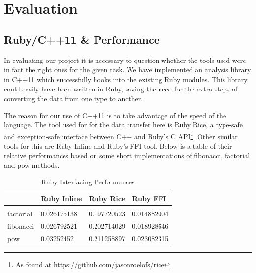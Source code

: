 \documentclass[11pt, abstracton, twoside, titlepage=true]{scrartcl}
\begin{document}


\newpage

\section{Evaluation}
\thispagestyle{empty}
\subsection{Ruby/C++11 \& Performance}
In evaluating our project it is necessary to question whether the tools used were
in fact the right ones for the given task. We have implemented an analysis library
in C++11 which successfully hooks into the existing Ruby modules. This library
could easily have been written in Ruby, saving the need for the extra steps
of converting the data from one type to another. 

The reason for our
use of C++11 is to take advantage of the speed of the language. The tool used for
for the data transfer here is Ruby Rice, a type-safe and exception-safe interface
between C++ and Ruby's C API\footnote{As found at https://github.com/jasonroelofs/rice}.
Other similar tools for this are Ruby Inline and Ruby's FFI tool. Below is a table
of their relative performances based on some short implementations of fibonacci, 
factorial and pow methods.

\begin{table}[h]
	\centering
	\caption{Ruby Interfacing Performances \cite{amber}} \label{ruby}

	\begin{tabular}{llll}
	          \\
	          & Ruby Inline & Ruby Rice   & Ruby FFI  \\ \hline
	          \\
	factorial & 0.026175138 & 0.197720523 & 0.014882004  \\
	fibonacci & 0.026792521 & 0.202714029 & 0.018928646  \\
	pow       & 0.03252452  & 0.211258897 & 0.023082315
	\end{tabular}
\end{table}
\end{document}
